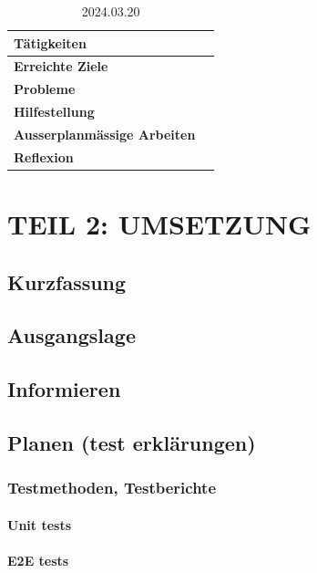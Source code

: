 \documentclass{report}
\begin{document}
\begin{table}[ht]
\caption{2024.03.20}
\begin{tabularx}{\textwidth}{|X|X|}
 \hline
 \textbf{Tätigkeiten} &   \\
 \hline
 \textbf{Erreichte Ziele} &   \\
  \hline
 \textbf{Probleme} &   \\
 \hline
 \textbf{Hilfestellung} &  \\
 \hline
 \textbf{Ausserplanmässige Arbeiten} &   \\
 \hline
 \textbf{Reflexion} &   \\
\hline
\end{tabularx}

\end{table}

\chapter{TEIL 2: UMSETZUNG}

\section{Kurzfassung}


\section{Ausgangslage}


\section{Informieren}


\section{Planen (test erklärungen)}

\subsection{Testmethoden, Testberichte}

\subsubsection{Unit tests}
\subsubsection{E2E tests}
\end{document}
